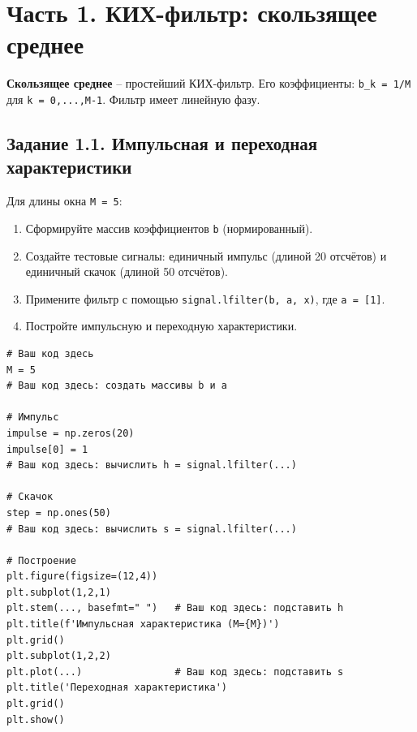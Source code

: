 \documentclass[12pt,a4paper,openany]{book}
\providecommand{\tightlist}{\setlength{\itemsep}{0pt}\setlength{\parskip}{0pt}}
\begin{document}
\section*{Часть 1. КИХ-фильтр: скользящее среднее}

\textbf{Скользящее среднее} -- простейший КИХ-фильтр. Его коэффициенты: \texttt{b\_\allowbreak{}k\ =\allowbreak{}\ 1/\allowbreak{}M} для \texttt{k\ =\allowbreak{}\ 0,\allowbreak{}.\allowbreak{}.\allowbreak{}.\allowbreak{},\allowbreak{}M-1}. Фильтр имеет линейную фазу.

\subsection*{Задание 1.1. Импульсная и переходная характеристики}

Для длины окна \texttt{M\ =\allowbreak{}\ 5}:

\begin{enumerate}
\def\labelenumi{\arabic{enumi}.}
\tightlist
\item
  Сформируйте массив коэффициентов \texttt{b} (нормированный).
\item
  Создайте тестовые сигналы: единичный импульс (длиной 20 отсчётов) и единичный скачок (длиной 50 отсчётов).
\item
  Примените фильтр с помощью \texttt{signal.\allowbreak{}lfilter(\allowbreak{}b,\allowbreak{}\ a,\allowbreak{}\ x)}, где \texttt{a\ =\allowbreak{}\ {[}1{]}}.
\item
  Постройте импульсную и переходную характеристики.
\end{enumerate}

\begin{Verbatim}[fontsize=\small, breaklines, breakanywhere, frame=single, framesep=2mm]
# Ваш код здесь
M = 5
# Ваш код здесь: создать массивы b и a

# Импульс
impulse = np.zeros(20)
impulse[0] = 1
# Ваш код здесь: вычислить h = signal.lfilter(...)

# Скачок
step = np.ones(50)
# Ваш код здесь: вычислить s = signal.lfilter(...)

# Построение
plt.figure(figsize=(12,4))
plt.subplot(1,2,1)
plt.stem(..., basefmt=" ")   # Ваш код здесь: подставить h
plt.title(f'Импульсная характеристика (M={M})')
plt.grid()
plt.subplot(1,2,2)
plt.plot(...)                # Ваш код здесь: подставить s
plt.title('Переходная характеристика')
plt.grid()
plt.show()
\end{Verbatim}
\end{document}
